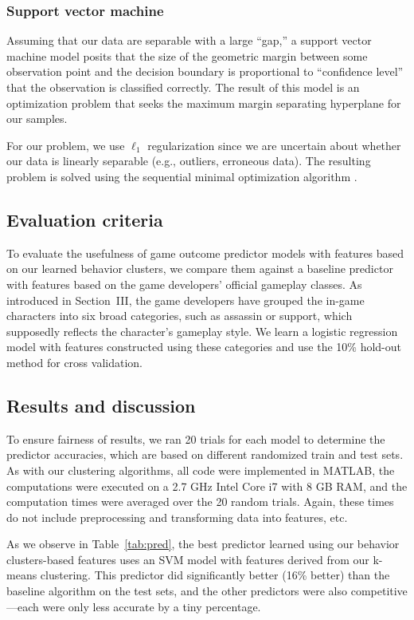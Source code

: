 \documentclass[letterpaper,10 pt,conference]{ieeeconf}
\begin{document}
\subsubsection{Support vector machine}

Assuming that our data are separable with a large ``gap,'' a support vector machine model posits that the size of the geometric margin between some observation point and the decision boundary is proportional to ``confidence level'' that the observation is classified correctly. The result of this model is an optimization problem that seeks the maximum margin separating hyperplane for our samples. 

For our problem, we use $\ell_{1}$ regularization since we are uncertain about whether our data is linearly separable (e.g., outliers, erroneous data). The resulting problem is solved using the sequential minimal optimization algorithm \cite{SBS:99}.

\subsection{Evaluation criteria}

To evaluate the usefulness of game outcome predictor models with features based on our learned behavior clusters, we compare them against a baseline predictor with features based on the game developers' official gameplay classes. As introduced in Section~III, the game developers have grouped the in-game characters into six broad categories, such as assassin or support, which supposedly reflects the character's gameplay style. We learn a logistic regression model with features constructed using these categories and use the 10\% hold-out method for cross validation. 

\subsection{Results and discussion}

To ensure fairness of results, we ran 20 trials for each model to determine the predictor accuracies, which are based on different randomized train and test sets. As with our clustering algorithms, all code were implemented in MATLAB, the computations were executed on a 2.7 GHz Intel Core i7 with 8 GB RAM, and the computation times were averaged over the 20 random trials. Again, these times do not include preprocessing and transforming data into features, etc.

As we observe in Table~\ref{tab:pred}, the best predictor learned using our behavior clusters-based features uses an SVM model with features derived from our k-means clustering. This predictor did significantly better (16\% better) than the baseline algorithm on the test sets, and the other predictors were also competitive---each were only less accurate by a tiny percentage. 
\end{document}
